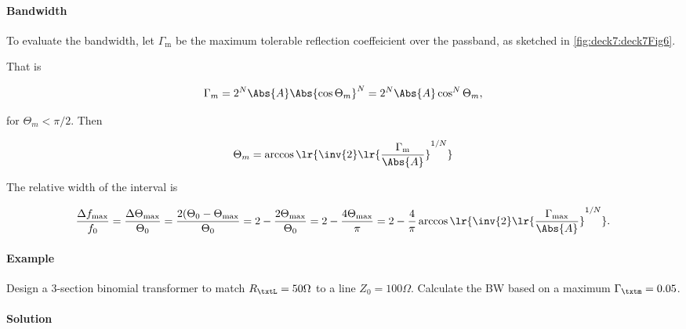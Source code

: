 \paragraph{Bandwidth}

To evaluate the bandwidth, let \( \Gamma_{\mathrm{m}} \) be the maximum tolerable reflection coeffeicient over the passband, as sketched in \cref{fig:deck7:deck7Fig6}.


That is

\begin{dmath}\label{eqn:uwavesDeck7MultisectionTransformersCore:400}
\Gamma_m 
= 2^N \Abs{A} \Abs{\cos \Theta_m }^N 
= 2^N \Abs{A} \cos^N \Theta_m,
\end{dmath}

for \( \Theta_m < \pi/2 \).  Then

\begin{dmath}\label{eqn:uwavesDeck7MultisectionTransformersCore:420}
\Theta_m = \arccos\lr{ \inv{2} \lr{ \frac{\Gamma_{\mathrm{m}}}{\Abs{A}}}^{1/N} }
\end{dmath}

The relative width of the interval is

\begin{dmath}\label{eqn:uwavesDeck7MultisectionTransformersCore:440}
\frac{\Delta f_{\mathrm{max}}}{f_0}
=
\frac{\Delta \Theta_{\mathrm{max}}}{\Theta_0}
=
\frac{2 (\Theta_0 - \Theta_{\mathrm{max}}}{\Theta_0}
=
2 - \frac{2 \Theta_{\mathrm{max}}}{\Theta_0}
=
2 - \frac{4 \Theta_{\mathrm{max}}}{\pi}
=
2 - \frac{4 }{\pi} \arccos\lr{ \inv{2} \lr{ \frac{\Gamma_{\mathrm{max}}}{\Abs{A}}}^{1/N} }.
\end{dmath}

\paragraph{Example}

Design a 3-section binomial transformer to match \( R_\txtL = 50 \Omega \) to a line \( Z_0 = 100 \Omega \).  Calculate the BW based on a maximum \( \Gamma_\txtm = 0.05 \).

\paragraph{Solution}

%

